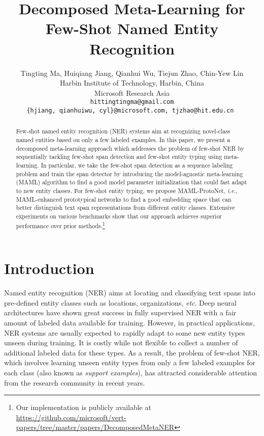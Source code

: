 \documentclass[11pt]{article}
\title{Decomposed Meta-Learning for Few-Shot Named Entity Recognition}
\author{Tingting Ma\footnotemark[2] \footnotemark[1] , 
Huiqiang Jiang\footnotemark[1] , 
Qianhui Wu\footnotemark[1] , 
Tiejun Zhao,
Chin-Yew Lin \\ 
Harbin Institute of Technology, Harbin, China \\
Microsoft Research Asia \\
\tt hittingtingma@gmail.com \\
\tt \{hjiang, qianhuiwu, cyl\}@microsoft.com, tjzhao@hit.edu.cn 
}
\newcommand\ie{\textit{i.e.}}
\newcommand\etc{\textit{etc}}
\begin{document}
\maketitle

\renewcommand{\thefootnote}{\fnsymbol{footnote}}

\renewcommand{\thefootnote}{\arabic{footnote}}

\begin{abstract}
Few-shot named entity recognition (NER) systems aim at recognizing novel-class named entities based on only a few labeled examples. In this paper, we present a decomposed meta-learning approach which addresses the problem of few-shot NER by sequentially tackling few-shot span detection and few-shot entity typing using meta-learning. In particular, we take the few-shot span detection as a sequence labeling problem and train the span detector by introducing the model-agnostic meta-learning (MAML) algorithm to find a good model parameter initialization that could fast adapt to new entity classes. For few-shot entity typing, we propose MAML-ProtoNet, \ie, MAML-enhanced prototypical networks to find a good embedding space that can better distinguish text span representations from different entity classes. Extensive experiments on various benchmarks show that our approach achieves superior performance over prior methods.\footnote{Our implementation is publicly available at \url{https://github.com/microsoft/vert-papers/tree/master/papers/DecomposedMetaNER}}
\end{abstract}







\section{Introduction}
Named entity recognition (NER) aims at locating and classifying text spans into pre-defined entity classes such as locations, organizations, \etc.
Deep neural architectures have shown great success in fully supervised NER \citep{lample2016neural,ma2016end,chiu2016named,peters2017semi} with a fair amount of labeled data available for training.
However, in practical applications, NER systems are usually expected to rapidly adapt to some new entity types unseen during training.
It is costly while not flexible to collect a number of additional labeled data for these types.
As a result, the problem of few-shot NER, which involves learning unseen entity types from only a few labeled examples for each class (also known as \emph{support examples}), has attracted considerable attention from the research community in recent years.
\end{document}
